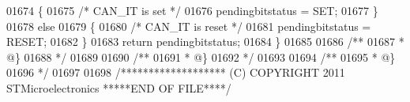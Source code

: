 \begin{DoxyCode}
01674   \{
01675     \textcolor{comment}{/* CAN\_IT is set */}
01676     pendingbitstatus = SET;
01677   \}
01678   \textcolor{keywordflow}{else}
01679   \{
01680     \textcolor{comment}{/* CAN\_IT is reset */}
01681     pendingbitstatus = RESET;
01682   \}
01683   \textcolor{keywordflow}{return} pendingbitstatus;
01684 \}
01685 
01686 \textcolor{comment}{/**}
01687 \textcolor{comment}{  * @\}}
01688 \textcolor{comment}{  */}
01689 
01690 \textcolor{comment}{/**}
01691 \textcolor{comment}{  * @\}}
01692 \textcolor{comment}{  */}
01693 
01694 \textcolor{comment}{/**}
01695 \textcolor{comment}{  * @\}}
01696 \textcolor{comment}{  */}
01697 
01698 \textcolor{comment}{/******************* (C) COPYRIGHT 2011 STMicroelectronics *****END OF FILE****/}
\end{DoxyCode}
